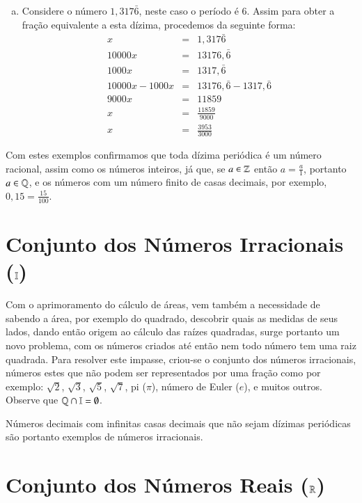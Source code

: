 \begin{exem}
\begin{enumerate}[a)]
   \item Considere o número $1,317\bar{6}$, neste caso o período é $6$. Assim para obter a fração equivalente a esta dízima, procedemos da seguinte forma:
   \begin{eqnarray*}
    x &=& 1,317\bar{6} \\
    10000 x &=& 13176, \bar{6} \\
    1000 x &=& 1317,\bar{6}\\
    10000 x - 1000 x &=& 13176, \bar{6} - 1317,\bar{6}\\
    9000 x &=& 11859 \\
    x &=& \frac{11859}{9000}\\
    x &=& \frac{3953}{3000}
   \end{eqnarray*}

  \end{enumerate}

 \end{exem}

Com estes exemplos confirmamos que toda dízima periódica é um número racional, assim como os números inteiros, já que, se $a \in \mathbb{Z}$ então $a=\frac{a}{1}$, portanto $a \in \mathbb{Q}$, e os números com um número finito de casas decimais, por exemplo, $0,15= \frac{15}{100}$.


\section{Conjunto dos Números Irracionais (\texorpdfstring{$\mathbb{I}$}{I})}

Com o aprimoramento do cálculo de áreas, vem também a necessidade de sabendo a área, por exemplo do quadrado, descobrir quais as medidas de seus lados, dando então origem ao cálculo das raízes quadradas, surge portanto um novo problema, com os números criados até então nem todo número tem uma raiz quadrada. Para resolver este impasse, criou-se o conjunto dos números irracionais, números estes que não podem ser representados por uma fração como por exemplo: $\sqrt{2}$, $\sqrt{3}$, $\sqrt{5}$, $\sqrt{7}$, pi ($\pi$), número de Euler ($e$), e muitos outros. Observe que $\mathbb{Q} \cap \mathbb{I} = \emptyset$.

Números decimais com infinitas casas decimais que não sejam dízimas periódicas são portanto exemplos de números irracionais.

\section{Conjunto dos Números Reais (\texorpdfstring{$\mathbb{R}$}{R})}

